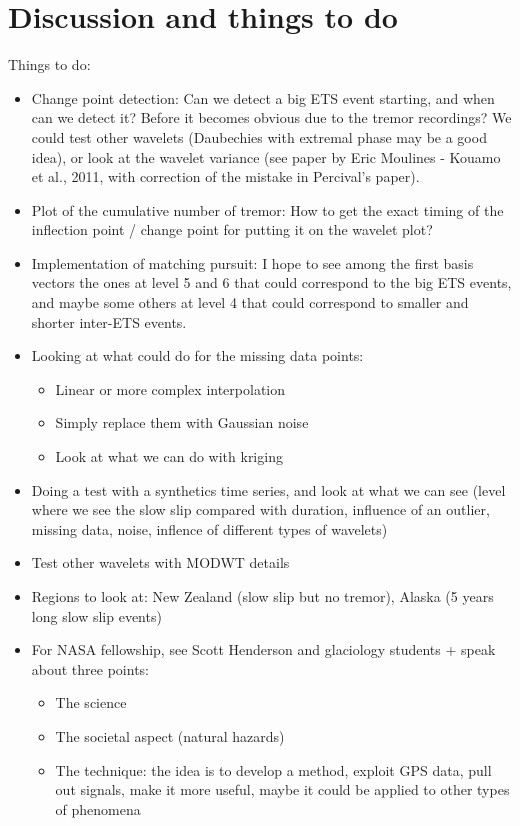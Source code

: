 \documentclass[main.tex]{subfiles}
\begin{document}
\chapter{Discussion and things to do}

Things to do:

\begin{itemize}

\item Change point detection: Can we detect a big ETS event starting, and when can we detect it? Before it becomes obvious due to the tremor recordings? We could test other wavelets (Daubechies with extremal phase may be a good idea), or look at the wavelet variance (see paper by Eric Moulines - Kouamo et al., 2011, with correction of the mistake in Percival's paper).

\item Plot of the cumulative number of tremor: How to get the exact timing of the inflection point / change point for putting it on the wavelet plot?

\item Implementation of matching pursuit: I hope to see among the first basis vectors the ones at level 5 and 6 that could correspond to the big ETS events, and maybe some others at level 4 that could correspond to smaller and shorter inter-ETS events.

\item Looking at what could do for the missing data points:
\begin{itemize}
	\item Linear or more complex interpolation
	\item Simply replace them with Gaussian noise
	\item Look at what we can do with kriging
\end{itemize}

\item Doing a test with a synthetics time series, and look at what we can see (level where we see the slow slip compared with duration, influence of an outlier, missing data, noise, inflence of different types of wavelets)

\item Test other wavelets with MODWT details

\item Regions to look at: New Zealand (slow slip but no tremor), Alaska (5 years long slow slip events)

\item For NASA fellowship, see Scott Henderson and glaciology students + speak about three points:
\begin{itemize}
	\item The science
	\item The societal aspect (natural hazards)
	\item The technique: the idea is to develop a method, exploit GPS data, pull out signals, make it more useful, maybe it could be applied to other types of phenomena
\end{itemize}

\end{itemize}
\end{document}
